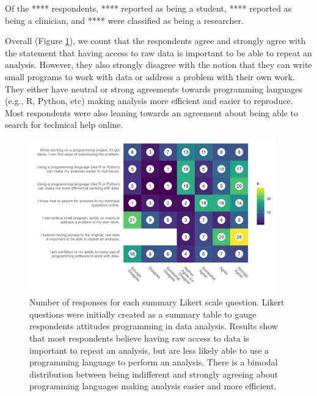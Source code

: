 \documentclass[020-persona\_validation.tex]{subfiles}
\begin{document}
        Of the **** respondents,
        **** reported as being a student,
        **** reported as being a clinician, and
        **** were classified as being a researcher.

        Overall (Figure \ref{fig:likert}),
        we count that the respondents agree and strongly agree with the statement
        that having access to raw data is important to be able to repeat an analysis.
        However, they also strongly disagree with the notion that
        they can write small programs to work with data or address a problem with their own work. %
        They either have neutral or strong agreements towards programming languages (e.g., R, Python, etc)
        making analysis more efficient and easier to reproduce.
        Most respondents were also leaning towards an agreement about being able to search for technical help online.

        \begin{figure}[htb]
            \centering
            \includegraphics[width=0.95\textwidth]{figs/020-persona/likert.png}
            \caption[Summary Likert scale responses]
            {Number of responses for each summary Likert scale question.
             Likert questions were initially created as a summary table to gauge respondents attitudes programming
             in data analysis.
             Results show that most respondents believe having raw access to data is important to repeat an analysis,
             but are less likely able to use a programming language to perform an analysis.
             There is a bimodal distribution between being indifferent and strongly agreeing
             about programming languages making analysis easier and more efficient.
            }
            \label{fig:likert}
        \end{figure}
        
\end{document}

